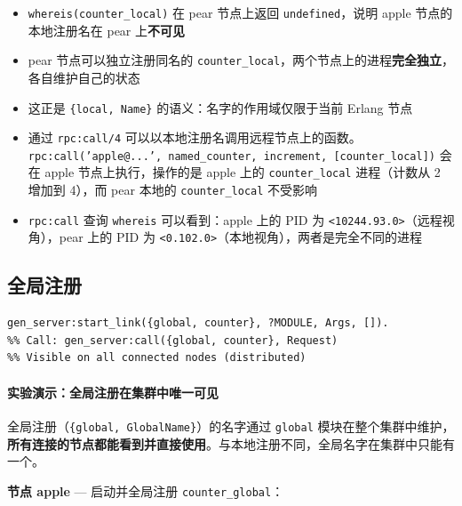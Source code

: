 \documentclass[a4paper,11pt]{article}
\begin{document}
\begin{tipbox}[本地注册的关键特性]
\begin{itemize}[leftmargin=1.5em]
    \item \texttt{whereis(counter\_local)} 在 pear 节点上返回 \texttt{undefined}，说明 apple 节点的本地注册名在 pear 上\textbf{不可见}
    \item pear 节点可以独立注册同名的 \texttt{counter\_local}，两个节点上的进程\textbf{完全独立}，各自维护自己的状态
    \item 这正是 \texttt{\{local, Name\}} 的语义：名字的作用域仅限于当前 Erlang 节点
    \item 通过 \texttt{rpc:call/4} 可以以本地注册名调用远程节点上的函数。\texttt{rpc:call('apple@...', named\_counter, increment, [counter\_local])} 会在 apple 节点上执行，操作的是 apple 上的 \texttt{counter\_local} 进程（计数从 2 增加到 4），而 pear 本地的 \texttt{counter\_local} 不受影响
    \item \texttt{rpc:call} 查询 \texttt{whereis} 可以看到：apple 上的 PID 为 \texttt{<10244.93.0>}（远程视角），pear 上的 PID 为 \texttt{<0.102.0>}（本地视角），两者是完全不同的进程
\end{itemize}
\end{tipbox}

\subsection{全局注册}

\begin{lstlisting}[style=erlangstyle]
gen_server:start_link({global, counter}, ?MODULE, Args, []).
%% Call: gen_server:call({global, counter}, Request)
%% Visible on all connected nodes (distributed)
\end{lstlisting}

\paragraph{实验演示：全局注册在集群中唯一可见}

全局注册（\texttt{\{global, GlobalName\}}）的名字通过 \texttt{global} 模块在整个集群中维护，\textbf{所有连接的节点都能看到并直接使用}。与本地注册不同，全局名字在集群中只能有一个。

\textbf{节点 apple} --- 启动并全局注册 \texttt{counter\_global}：
\end{document}
